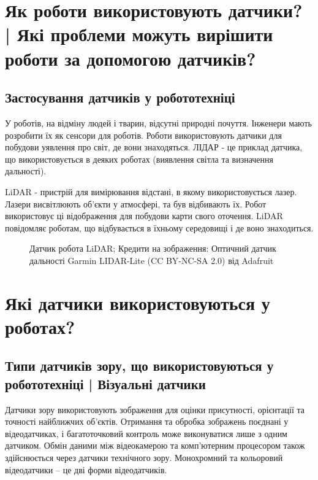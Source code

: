 \documentclass[a4paper,14pt]{extreport}
\begin{document}
\section{Як роботи використовують датчики? | Які проблеми можуть вирішити роботи за допомогою датчиків?}\par



\subsection{Застосування датчиків у робототехніці}
У роботів, на відміну людей і тварин, відсутні природні почуття. Інженери мають розробити їх як сенсори для роботів. Роботи використовують датчики для побудови уявлення про світ, де вони знаходяться. ЛІДАР - це приклад датчика, що використовується в деяких роботах (виявлення світла та визначення дальності).

LiDAR - пристрій для вимірювання відстані, в якому використовується лазер. Лазери висвітлюють об'єкти у атмосфері, та був відбивають їх. Робот використовує ці відображення для побудови карти свого оточення. LiDAR повідомляє роботам, що відбувається в їхньому середовищі і де воно знаходиться.\\ 


\begin{figure}[h!]
   \caption{Датчик робота LiDAR; Кредити на зображення: Оптичний датчик дальності Garmin LIDAR-Lite (CC BY-NC-SA 2.0) від Adafruit}
 \end{figure}



\section{Які датчики використовуються у роботах?}\par

\subsection{Типи датчиків зору, що використовуються у робототехніці | Візуальні датчики }
Датчики зору використовують зображення для оцінки присутності, орієнтації та точності найближчих об'єктів. Отримання та обробка зображень поєднані у відеодатчиках, і багатоточковий контроль може виконуватися лише з одним датчиком. Обмін даними між відеокамерою та комп'ютерним процесором також здійснюється через датчики технічного зору. Монохромний та кольоровий відеодатчики – це дві форми відеодатчиків.
\end{document}

